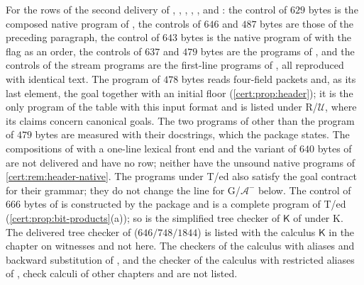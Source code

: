 For the rows of the second delivery of ,
, , ,
,  and :
the control of $629$ bytes is the composed native program of
, the controls of $646$ and $487$ bytes are those of
the preceding paragraph, the control of $643$ bytes is the native program of
 with the flag as an order, the controls of $637$ and
$479$ bytes are the programs of , and the controls
of the stream programs are the first-line programs of , all
reproduced with identical text. The program of $478$ bytes reads four-field
packets and, as its last element, the goal together with an initial floor
(\cref{cert:prop:header}); it is the only program of the table with this input
format and is listed under R/$\mathcal U$, where its claims concern canonical
goals. The two programs of  other than the program of
$479$ bytes are measured with their docstrings, which the package states. The
compositions of  with a one-line lexical front end
and the variant of $640$ bytes of  are not delivered
and have no row; neither have the unsound native programs of
\cref{cert:rem:header-native}. The programs under T/ed also satisfy the goal
contract for their grammar; they do not change the line for
G/$\mathcal A^{-}$ below. The control of $666$ bytes of 
is constructed by the package and is a complete program of T/ed
(\cref{cert:prop:bit-products}(a)); so is the simplified tree checker of
$\mathsf K$ of  under K. The delivered tree checker of
 ($646/748/1844$) is listed with the calculus
$\mathsf K$ in the chapter on witnesses and not here. The checkers of the
calculus with aliases and backward substitution of , and the
checker of the calculus with restricted aliases of ,
check calculi of other chapters and are not listed.

